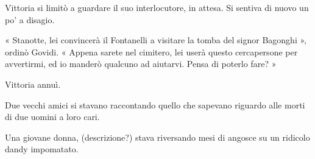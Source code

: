 Vittoria si limitò a guardare il suo interlocutore, in attesa. Si sentiva di nuovo un po' a disagio.

« Stanotte, lei convincerà il Fontanelli a visitare la tomba del signor Bagonghi », ordinò Govidi. « Appena sarete nel cimitero, lei userà questo cercapersone per avvertirmi, ed io manderò qualcuno ad aiutarvi. Pensa di poterlo fare? »

Vittoria annuì.






Due vecchi amici si stavano raccontando quello che sapevano riguardo alle morti di due uomini a loro cari.

Una giovane donna, (descrizione?) stava riversando mesi di angosce su un ridicolo dandy impomatato.

